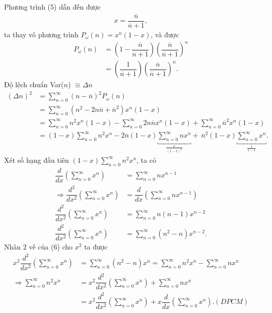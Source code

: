 \documentclass{article}
\newcommand{\f}[2]{\dfrac{#1}{#2}}
\begin{document}
Phương trình (5) dẫn đến được
\begin{align*}
	x = \f{\overline{n}}{\overline{n} + 1},
\end{align*}
ta thay vô phương trình $P_{\omega}(n) = x^{n} (1-x)$, và được
\begin{align*}
	P_{\omega}(n)
	& = \left(1 - \f{\overline{n}}{\overline{n} + 1}\right) \left(\f{\overline{n}}{\overline{n} + 1}\right)^{n}  \\
	& = \left(\f{1}{\overline{n} + 1}\right)\left(\f{\overline{n}}{\overline{n} + 1}\right)^{n} .
\end{align*}
Độ lệch chuẩn Var($n$) $\equiv \Delta n$
\begin{align*}
	(\Delta n)^2 
	&= \sum_{n = 0}^{\infty}(n - \overline{n})^2 P_{\omega}(n) \\
	&= \sum_{n = 0}^{\infty}(n^2 - 2n\overline{n} + \overline{n}^2) x^{n} (1-x) \\
	&= \sum_{n = 0}^{\infty}n^2 x^{n} (1-x) - \sum_{n = 0}^{\infty}2n\overline{n} x^{n} (1-x) + \sum_{n = 0}^{\infty}\overline{n}^2 x^{n} (1-x) \\
	&= (1-x)\sum_{n = 0}^{\infty}n^2 x^{n} - 2\overline{n}(1-x)\underbracket{\sum_{n = 0}^{\infty}n x^{n}}_{\frac{x}{(1 - x)^2}}  +\, \overline{n}^2(1-x) \underbracket{\sum_{n = 0}^{\infty} x^{n}}_{\frac{1}{1 - x}}. \tag{6}
\end{align*}
Xét số hạng đầu tiên $(1-x)\sum_{n = 0}^{\infty}n^2 x^{n}$, ta có
\begin{align*}
	\f{d}{dx} \left( \sum_{n = 0}^{\infty} x^{n} \right) 
	&= \sum_{n = 0}^{\infty} n x^{n-1} \\
	\Rightarrow \f{d^2}{dx^2} \left( \sum_{n = 0}^{\infty} x^{n} \right)
	&= \f{d}{dx} \left( \sum_{n = 0}^{\infty} n x^{n-1} \right) \\
	\f{d^2}{dx^2} \left( \sum_{n = 0}^{\infty} x^{n} \right) &= \sum_{n = 0}^{\infty} n(n-1) x^{n-2} \\
	\f{d^2}{dx^2} \left( \sum_{n = 0}^{\infty} x^{n} \right) &= \sum_{n = 0}^{\infty} (n^2-n) x^{n-2}. \tag{7}
\end{align*}
Nhân 2 vế của (6) cho $x^2$ ta được
\begin{align*}
	x^2 \f{d^2}{dx^2} \left( \sum_{n = 0}^{\infty} x^{n} \right) &= \sum_{n = 0}^{\infty} (n^2-n) x^{n} 
	= \sum_{n = 0}^{\infty} n^2 x^{n} - \sum_{n = 0}^{\infty} nx^{n} \\
	\Rightarrow \sum_{n = 0}^{\infty} n^2 x^{n} 
	&= x^2 \f{d^2}{dx^2} \left( \sum_{n = 0}^{\infty} x^{n} \right) + \sum_{n = 0}^{\infty} nx^{n} \\
	&= x^2 \f{d^2}{dx^2} \left( \sum_{n = 0}^{\infty} x^{n} \right) + x \f{d}{dx} \left( \sum_{n = 0}^{\infty} x^{n} \right) .(DPCM) \tag{8} 
\end{align*}
\end{document}
